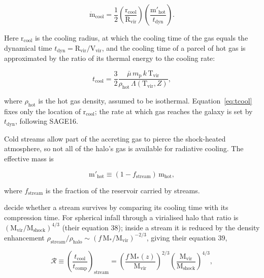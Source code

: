 \begin{equation}
\dot{\mathrm{m}}_{\mathrm{cool}} = \frac{1}{2}
\left( \frac{\mathrm{r_{cool}}}{\mathrm{R_{vir}}} \right)
\left( \frac{\mathrm{m'_{hot}}}{t_{\mathrm{dyn}}} \right).
\label{eq:mcool}
\end{equation}

Here $\mathrm{r_{cool}}$ is the cooling radius, at which the cooling time of the
gas equals the dynamical time $t_{\mathrm{dyn}} =
\mathrm{R_{vir}}/\mathrm{V_{vir}}$, and the cooling time of a parcel of hot gas
is approximated by the ratio of its thermal energy to the cooling rate:

\begin{equation}
t_{\mathrm{cool}} = \frac{3}{2}
\frac{\bar{\mu}\, m_{\mathrm{p}}\, k\, \mathrm{T_{vir}}}
     {\rho_{\mathrm{hot}}\, \Lambda(\mathrm{T_{vir}}, Z)},
\label{eq:tcool}
\end{equation}

where $\rho_{\mathrm{hot}}$ is the hot gas density, assumed to be isothermal.
Equation~\ref{eq:tcool} fixes only the location of $\mathrm{r_{cool}}$; the rate
at which gas reaches the galaxy is set by $t_{\mathrm{dyn}}$, following SAGE16.

Cold streams allow part of the accreting gas to pierce the shock-heated
atmosphere, so not all of the halo's gas is available for radiative cooling. The
effective mass is

\begin{equation}
\mathrm{m'_{hot}} \equiv (1 - f_{\mathrm{stream}})\, \mathrm{m_{hot}},
\label{eq:mhot_eff}
\end{equation}

where $f_{\mathrm{stream}}$ is the fraction of the reservoir carried by streams.

\citet{DekelBirnboim2006} decide whether a stream survives by comparing its
cooling time with its compression time. For spherical infall through a
virialised halo that ratio is
$(\mathrm{M_{vir}}/\mathrm{M_{shock}})^{4/3}$ (their equation 38); inside a
stream it is reduced by the density enhancement
$\rho_{\mathrm{stream}}/\rho_{\mathrm{halo}} \sim
(f\,\mathrm{M_*}/\mathrm{M_{vir}})^{-2/3}$, giving their equation 39,

\begin{equation}
\mathcal{R} \equiv
\left( \frac{t_{\mathrm{cool}}}{t_{\mathrm{comp}}} \right)_{\mathrm{stream}} =
\left( \frac{f\, \mathrm{M_*}(z)}{\mathrm{M_{vir}}} \right)^{2/3}
\left( \frac{\mathrm{M_{vir}}}{\mathrm{M_{shock}}} \right)^{4/3},
\label{eq:dbratio}
\end{equation}

